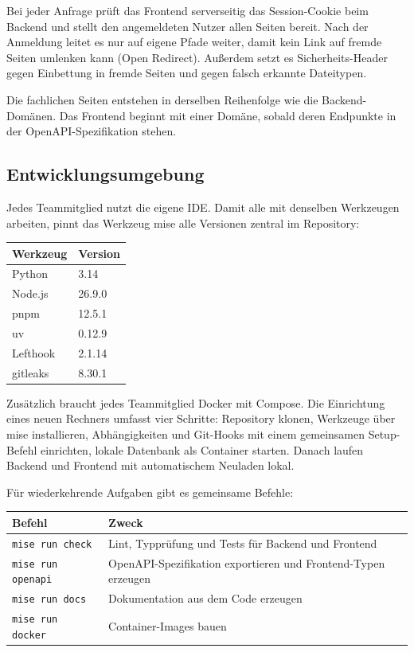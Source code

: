 \documentclass[11pt,a4paper]{article}
\begin{document}
Bei jeder Anfrage prüft das Frontend serverseitig das Session-Cookie beim Backend und stellt den angemeldeten Nutzer allen Seiten bereit. Nach der Anmeldung leitet es nur auf eigene Pfade weiter, damit kein Link auf fremde Seiten umlenken kann (Open Redirect). Außerdem setzt es Sicherheits-Header gegen Einbettung in fremde Seiten und gegen falsch erkannte Dateitypen.

Die fachlichen Seiten entstehen in derselben Reihenfolge wie die Backend-Domänen. Das Frontend beginnt mit einer Domäne, sobald deren Endpunkte in der OpenAPI-Spezifikation stehen.

\subsection{Entwicklungsumgebung}

Jedes Teammitglied nutzt die eigene IDE. Damit alle mit denselben Werkzeugen arbeiten, pinnt das Werkzeug mise alle Versionen zentral im Repository:

\begin{tabularx}{\linewidth}{@{}l l@{}}
\toprule
\textbf{Werkzeug} & \textbf{Version} \\
\midrule
\endhead
Python & 3.14 \\
Node.js & 26.9.0 \\
pnpm & 12.5.1 \\
uv & 0.12.9 \\
Lefthook & 2.1.14 \\
gitleaks & 8.30.1 \\
\bottomrule
\end{tabularx}

Zusätzlich braucht jedes Teammitglied Docker mit Compose. Die Einrichtung eines neuen Rechners umfasst vier Schritte: Repository klonen, Werkzeuge über mise installieren, Abhängigkeiten und Git-Hooks mit einem gemeinsamen Setup-Befehl einrichten, lokale Datenbank als Container starten. Danach laufen Backend und Frontend mit automatischem Neuladen lokal.

Für wiederkehrende Aufgaben gibt es gemeinsame Befehle:

\begin{tabularx}{\linewidth}{@{}>{\hsize=0.76\hsize\RaggedRight\arraybackslash}X >{\hsize=1.24\hsize\RaggedRight\arraybackslash}X@{}}
\toprule
\textbf{Befehl} & \textbf{Zweck} \\
\midrule
\endhead
\texttt{mise run check} & Lint, Typprüfung und Tests für Backend und Frontend \\
\texttt{mise run openapi} & OpenAPI-Spezifikation exportieren und Frontend-Typen erzeugen \\
\texttt{mise run docs} & Dokumentation aus dem Code erzeugen \\
\texttt{mise run docker} & Container-Images bauen \\
\bottomrule
\end{tabularx}
\end{document}
